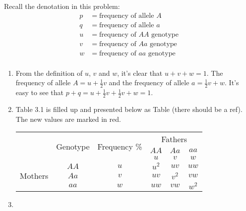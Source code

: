 \begin{homeworkProblem}[18]
Recall the denotation in this problem:
\[
    \begin{aligned}
        p &= \text{frequency of allele }A \\
        q &= \text{frequency of allele }a \\
        u &= \text{frequency of }AA\text{ genotype} \\
        v &= \text{frequency of }Aa\text{ genotype}  \\
        w &= \text{frequency of }aa\text{ genotype}  \\
    \end{aligned}
\]
\begin{enumerate}
\item From the definition of $u$, $v$ and $w$, it's clear that $u +v + w = 1$.
The frequency of allele $A = u + \frac{1}{2}v$ and the frequency of allele $a
= \frac{1}{2}v + w$. It's easy to see that $p + q = u + \frac{1}{2}v + \frac{1}{2}
v + w = 1$.
\item Table 3.1 is filled up and presented below as Table (there should be a ref).
The new values are marked in red.
\begin{table}[h!]
\centering
\begin{tabular}{|c|c|c|c|c|c|}
\hline
\multirow{3}{*}{ } &
\multirow{3}{*}{Genotype} &
\multirow{3}{*}{Frequency \%} &
\multicolumn{3}{|c|}{Fathers}\\
\cline{4-6}
& & & $AA$ & $Aa$ & $aa$ \\ \cline{4-6}
& & & $u$ & $v$ & $w$ \\
\hline
\multirow{3}{*}{Mothers} & $AA$ & $u$ & $u^2$ & $uv$ & $uw$\\
& $Aa$ & $v$ & {\color{red} $uv$} & $v^2$ & {\color{red} $vw$}\\
& $aa$ & $w$ & {\color{red} $uw$} & {\color{red}$vw$} & {\color{red}$w^2$} \\
\hline
\end{tabular}
\end{table}

\item \unsolved


\end{enumerate}
\end{homeworkProblem}
